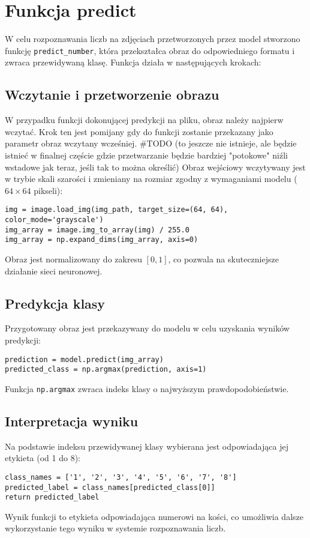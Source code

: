 \section{Funkcja predict}

W celu rozpoznawania liczb na zdjęciach przetworzonych przez model stworzono funkcję \texttt{predict\_number},
która przekształca obraz do odpowiedniego formatu i zwraca przewidywaną klasę.
Funkcja działa w następujących krokach:

\subsection{Wczytanie i przetworzenie obrazu}

W przypadku funkcji dokonującej predykcji na pliku, obraz należy najpierw wczytać. Krok ten jest pomijany gdy do funkcji zostanie przekazany jako parametr obraz wczytany wcześniej.
#TODO (to jeszcze nie istnieje, ale będzie istnieć w finalnej częście gdzie przetwarzanie będzie bardziej "potokowe" niźli wstadowe jak teraz, jeśli tak to można określić)
Obraz wejściowy wczytywany jest w trybie skali szarości i zmieniany na rozmiar zgodny z wymaganiami modelu ($64 \times 64$ pikseli):

\begin{verbatim}
img = image.load_img(img_path, target_size=(64, 64), color_mode='grayscale')
img_array = image.img_to_array(img) / 255.0
img_array = np.expand_dims(img_array, axis=0)
\end{verbatim}

Obraz jest normalizowany do zakresu $[0, 1]$, co pozwala na skuteczniejsze działanie sieci neuronowej.

\subsection{Predykcja klasy}

Przygotowany obraz jest przekazywany do modelu w celu uzyskania wyników predykcji:

\begin{verbatim}
prediction = model.predict(img_array)
predicted_class = np.argmax(prediction, axis=1)
\end{verbatim}

Funkcja \texttt{np.argmax} zwraca indeks klasy o najwyższym prawdopodobieństwie.

\subsection{Interpretacja wyniku}

Na podstawie indeksu przewidywanej klasy wybierana jest odpowiadająca jej etykieta (od 1 do 8):

\begin{verbatim}
class_names = ['1', '2', '3', '4', '5', '6', '7', '8']
predicted_label = class_names[predicted_class[0]]
return predicted_label
\end{verbatim}

Wynik funkcji to etykieta odpowiadająca numerowi na kości, co umożliwia dalsze wykorzystanie tego wyniku w systemie rozpoznawania liczb.
